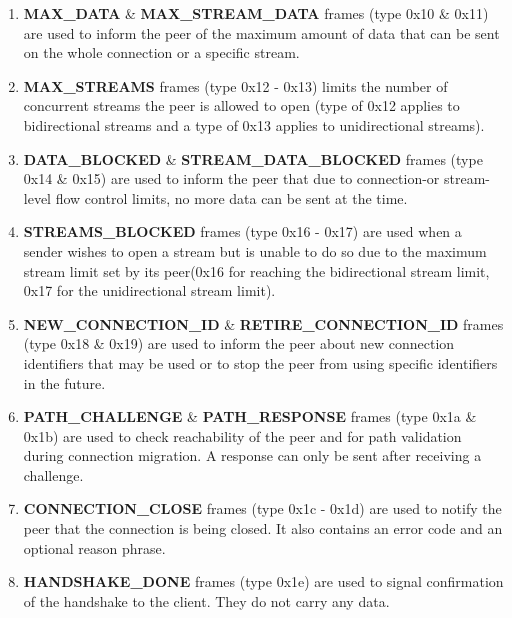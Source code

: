 \begin{enumerate}
    \item \textbf{MAX\_DATA} \& \textbf{MAX\_STREAM\_DATA} frames (type 0x10 \& 0x11) are used to inform the peer of the maximum amount of data that can be sent on the whole connection or a specific stream. \cite[112, 113]{rfc9000}
    \item \textbf{MAX\_STREAMS} frames (type 0x12 - 0x13) limits the number of concurrent streams the peer is allowed to open (type of 0x12 applies to bidirectional streams and a type of 0x13 applies to unidirectional streams). \cite[114]{rfc9000}
    \item \textbf{DATA\_BLOCKED} \& \textbf{STREAM\_DATA\_BLOCKED} frames (type 0x14 \& 0x15) are used to inform the peer that due to connection-or stream-level flow control limits, no more data can be sent at the time. \cite[114]{rfc9000}
    \item \textbf{STREAMS\_BLOCKED} frames (type 0x16 - 0x17) are used when a sender wishes to open a stream but is unable to do so due to the maximum stream limit set by its peer(0x16 for reaching the bidirectional stream limit, 0x17 for the unidirectional stream limit). \cite[115]{rfc9000}
    \item \textbf{NEW\_CONNECTION\_ID} \& \textbf{RETIRE\_CONNECTION\_ID} frames (type 0x18 \& 0x19) are used to inform the peer about new connection identifiers that may be used or to stop the peer from using specific identifiers in the future. \cite[116, 117]{rfc9000}
    \item \textbf{PATH\_CHALLENGE} \& \textbf{PATH\_RESPONSE} frames (type 0x1a \& 0x1b) are used to check reachability of the peer and for path validation during connection migration. A response can only be sent after receiving a challenge. \cite[118, 119]{rfc9000}
    \item \textbf{CONNECTION\_CLOSE} frames (type 0x1c - 0x1d) are used to notify the peer that the connection is being closed. It also contains an error code and an optional reason phrase. \cite[119]{rfc9000}
    \item \textbf{HANDSHAKE\_DONE} frames (type 0x1e) are used to signal confirmation of the handshake to the client. They do not carry any data.\cite[120]{rfc9000}
\end{enumerate}

